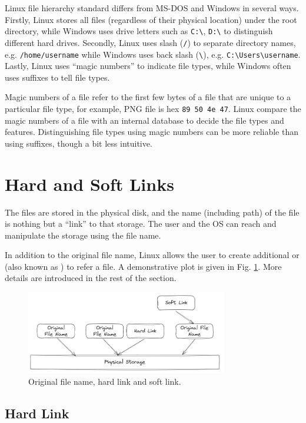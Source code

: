 Linux file hierarchy standard differs from MS-DOS and Windows in several ways. Firstly, Linux stores all files (regardless of their physical location) under the root directory, while Windows uses drive letters such as \verb|C:\|, \verb|D:\| to distinguish different hard drives. Secondly, Linux uses slash (\verb|/|) to separate directory names, e.g. \verb|/home/username| while Windows uses back slash (\verb|\|), e.g. \verb|C:\Users\username|. Lastly, Linux uses ``magic numbers'' to indicate file types, while Windows often uses suffixes to tell file types. 

Magic numbers of a file refer to the first few bytes of a file that are unique to a particular file type, for example, PNG file is hex \verb|89 50 4e 47|. Linux compare the magic numbers of a file with an internal database to decide the file types and features. Distinguishing file types using magic numbers can be more reliable than using suffixes, though a bit less intuitive.

\section{Hard and Soft Links}

The files are stored in the physical disk, and the name (including path) of the file is nothing but a ``link'' to that storage. The user and the OS can reach and manipulate the storage using the file name. 

In addition to the original file name, Linux allows the user to create additional  or  (also known as ) to refer a file. A demonstrative plot is given in Fig. \ref{fig:hardsoftlink}. More details are introduced in the rest of the section.

\begin{figure}[!htb]
	\centering
	\includegraphics[width=250pt]{chapters/part-1/figures/hardsoftlink.png}
	\caption{Original file name, hard link and soft link.} \label{fig:hardsoftlink}
\end{figure} 

\subsection{Hard Link}

